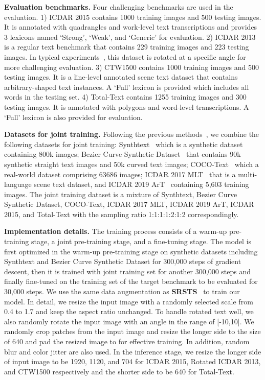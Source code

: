 \smallskip\noindent\textbf{Evaluation benchmarks.}
Four challenging benchmarks are used in the evaluation. 1) ICDAR 2015 contains 1000 training images and 500 testing images. It is annotated with quadrangles and work-level text transcriptions and provides 3 lexicons named ‘Strong’, ‘Weak’, and ‘Generic’ for evaluation. 
2) ICDAR 2013 is a regular text benchmark that contains 229 training images and 223 testing images. In typical experiments~\cite{liao2020mask, huang2022swintextspotter,kittenplon2022towards}, this dataset is rotated at a specific angle for more challenging evaluation.
3) CTW1500 contains 1000 training images and 500 testing images. It is a line-level annotated scene text dataset that contains arbitrary-shaped text instances. A `Full' lexicon is provided which includes all words in the testing set. 
4) Total-Text contains 1255 training images and 300 testing images. It is annotated with polygons and word-level transcriptions. A `Full' lexicon is also provided for evaluation.


\smallskip\noindent\textbf{Datasets for joint training.}
Following the previous methods~\cite{qiao2020mango,liu2021abcnet, zhang2022text,wu2022decoupling}, we combine the following datasets for joint training: Synthtext~\cite{gupta2016synthetic} which is a synthetic dataset containing 800k images; Bezier Curve Synthetic Dataset~\cite{liu2020abcnet} that contains 90k synthetic straight text images and 50k curved text images; COCO-Text~\cite{veit2016coco} which a real-world dataset comprising 63686 images; ICDAR 2017 MLT~\cite{nayef2017icdar2017} that is a multi-language scene text dataset, and ICDAR 2019 ArT~\cite{chng2019icdar2019} containing 5,603 training images. The joint training dataset is a mixture of Synthtext, Bezier Curve Synthetic Dataset, COCO-Text, ICDAR 2017 MLT, ICDAR 2019 ArT, ICDAR 2015, and Total-Text with the sampling ratio 1:1:1:1:2:1:2 correspondingly.


\smallskip\noindent\textbf{Implementation details.}
\label{sec:training}
The training process consists of a warm-up pre-training stage, a joint pre-training stage, and a fine-tuning stage. The model is first optimized in the warm-up pre-training stage on synthetic datasets including Synthtext and Bezier Curve Synthetic Dataset for 300,000 steps of gradient descent, then it is trained with joint training set for another 300,000 steps and finally fine-tuned on the training set of the target benchmark to be evaluated for 30,000 steps.  We use the same data augmentation as \textbf{SRSTS}~\cite{wu2022decoupling} to train our model. In detail, we resize the input image with a randomly selected scale from 0.4 to 1.7 and keep the aspect ratio unchanged.  To handle rotated text well, we also randomly rotate the input image with an angle in the range of [-10,10]. We randomly crop patches from the input image and resize the longer side to the size of 640 and pad the resized image to  for effective training. In addition, random blur and color jitter are also used. In the inference stage, we resize the longer side of input image to be 1920, 1120, and 704 for ICDAR 2015, Rotated ICDAR 2013, and CTW1500 respectively and the shorter side to be 640 for Total-Text.

